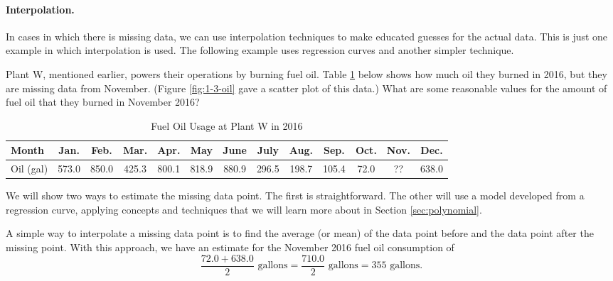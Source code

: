\paragraph{Interpolation.} In cases in which there is missing data, we can use interpolation techniques to make educated guesses for the actual data. This is just one example in which interpolation is used. The following example uses regression curves and another simpler technique.

\begin{example}
\label{ex:interpolation}
Plant W, mentioned earlier, powers their operations by burning fuel oil. Table \ref{tab:1-3-oil} below shows how much oil they burned in 2016, but they are missing data from November. (Figure \ref{fig:1-3-oil} gave a scatter plot of this data.) What are some reasonable values for the amount of fuel oil that they burned in November 2016?

\begin{table}[h!]
\centering
\begin{tabular}{l*{12}{c}}
\toprule
Month & Jan. & Feb. & Mar. & Apr. & May & June & July & Aug. & Sep. & Oct. & Nov. & Dec. \\
\midrule
Oil (gal) & 573.0 & 850.0 &  425.3 & 800.1  & 818.9 &  880.9 &  296.5 & 198.7 & 105.4 & 72.0 & ?? & 638.0\\
\bottomrule
\end{tabular}
\caption{Fuel Oil Usage at Plant W in 2016}
\label{tab:1-3-oil}
\end{table}
\solution We will show two ways to estimate the missing data point. The first is straightforward. The other will use a model developed from a regression curve, applying concepts and techniques that we will learn more about in Section \ref{sec:polynomial}.

A simple way to interpolate a missing data point is to find the average (or mean) of the data point before and the data point after the missing point. With this approach, we have an estimate for the November 2016 fuel oil consumption of
$$\frac{72.0 + 638.0}{2} \mbox{ gallons} = \frac{710.0}{2} \mbox{ gallons} = 355 \mbox{ gallons.}$$


\end{example}

